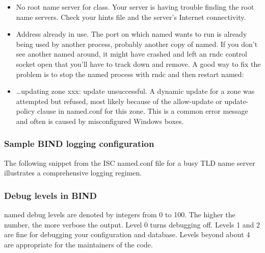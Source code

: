 \begin{itemize}
  {No default TTL set}. The preferred way to set the default TTL for
  resource records is with a {\$TTL} directive at the top of the zone
  file. This error message indicates that the {\$TTL} is missing; it is
  required in BIND 9.
\item
  {No root name server for class}. Your server is having trouble finding
  the root name servers. Check your hints file and the server's Internet
  connectivity.
\item
  {Address already in use}. The port on which {named} wants to run is
  already being used by another process, probably another copy of
  {named}. If you don't see another {named} around, it might have
  crashed and left an {rndc} control socket open that you'll have to
  track down and remove. A good way to fix the problem is to stop the
  {named} process with {rndc} and then restart {named}:
\end{itemize}


\begin{itemize}
\tightlist
\item
  { \ldots updating zone xxx: update unsuccessful. }A dynamic update for
  a zone was attempted but refused, most likely because of the
  {allow-update} or {update-policy} clause in {named.conf} for this
  zone. This is a common error message and often is caused by
  misconfigured Windows boxes.
\end{itemize}

\subsubsection[Sample BIND logging
configuration]{\texorpdfstring{\protect\hypertarget{part0024_split_070.htmlux5cux23_idTextAnchor962}{}{}Sample
BIND logging configuration}{Sample BIND logging configuration}}

The following snippet from the ISC {named.conf }file for a busy TLD name
server illustrates a comprehensive logging regimen.


\subsubsection[Debug levels in
BIND]{\texorpdfstring{\protect\hypertarget{part0024_split_070.htmlux5cux23_idTextAnchor963}{}{}Debug
levels in BIND}{Debug levels in BIND}}

\protect\hypertarget{part0024_split_070.htmlux5cux23_idIndexMarker2291}{}{}{named}
debug levels are denoted by integers from 0 to 100. The higher the
number, the more verbose the output. Level 0 turns debugging off. Levels
1 and 2 are fine for debugging your configuration and database. Levels
beyond about 4 are appropriate for the maintainers of the code.

